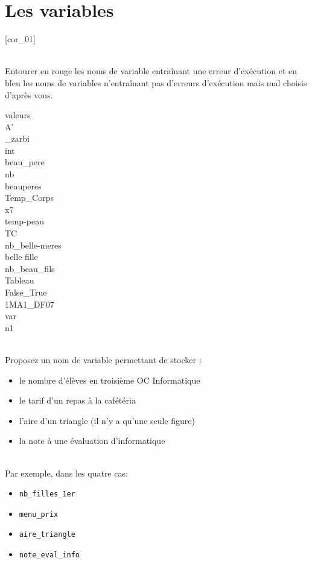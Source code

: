 \documentclass[a4paper,12pt]{article}
\newcommand{\numero}{2}                                    %
\begin{document}


\setcounter{section}{\numero}
\section{Les variables}				
[cor_01]

\exo{}  ~\\ 
 Entourer en rouge les noms de variable entraînant une erreur d’exécution et en bleu les noms de variables n’entraînant pas d’erreurs d’exécution mais mal choisis d'après vous.
\begin{multicols}{7}
	{\small
		valeurs\\
		A'\\
		\_zarbi\\
		int\\
		beau\_pere\\
		nb\\
		beauperes\\
		Temp\_Corps \\
		x7\\
		temp-peau\\
		TC\\
		nb\_belle-meres\\
		belle fille\\
		nb\_beau\_fils\\
		Tableau\\
		False\_True\\
		1MA1\_DF07\\
		var\\
		n1
	}
\end{multicols}		
\finexo

\exo{}  ~\\ 
Proposez un nom de variable permettant de stocker :
\begin{itemize}
	\item le nombre d'élèves en troisième OC Informatique
	\item  le tarif d’un repas à la cafétéria
	\item l’aire d’un triangle (il n’y a qu’une seule figure)
	\item la note à une évaluation d’informatique
\end{itemize}
	\begin{correction}
		~\\ 
		Par exemple, dans les quatre cas:
		\begin{itemize}
			\item \lstinline{nb_filles_1er}
			\item  \lstinline{menu_prix}
			\item  \lstinline{aire_triangle}
			\item  \lstinline{note_eval_info}
		\end{itemize}
	\end{correction}
\finexo
\end{document}
